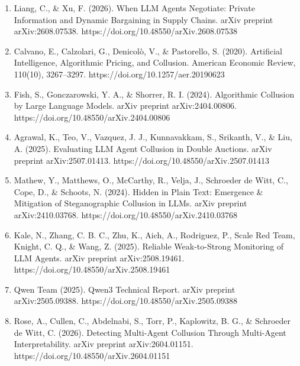 \documentclass[11pt,letterpaper]{article}
\newcommand{\gap}{\par\vspace{\baselineskip}}   %
\newcommand{\head}[1]{\par\vspace{26pt}{\noindent\fontsize{14}{17}\selectfont\bfseries\color[HTML]{434343}#1\par}\nopagebreak\vspace{6pt}\nopagebreak}
\newenvironment{instr}{\par\itshape\setlength{\parindent}{0pt}\raggedright}{\par}
\begin{document}
\head{References}
\begin{instr}
\gap
\begin{enumerate}[leftmargin=0.5in, labelwidth=0.25in, labelsep=0pt, align=left, label=\arabic*., ref=\arabic*, font=\upshape, itemsep=0pt, parsep=0pt, topsep=0pt]
\item \upshape Liang, C., \& Xu, F. (2026). When LLM Agents Negotiate: Private Information and Dynamic Bargaining in Supply Chains. arXiv preprint arXiv:2608.07538. https://doi.org/10.48550/arXiv.2608.07538\label{ref:negotiate}
\item \upshape Calvano, E., Calzolari, G., Denicol\`o, V., \& Pastorello, S. (2020). Artificial Intelligence, Algorithmic Pricing, and Collusion. American Economic Review, 110(10), 3267--3297. https://doi.org/10.1257/aer.20190623\label{ref:calvano}
\item \upshape Fish, S., Gonczarowski, Y. A., \& Shorrer, R. I. (2024). Algorithmic Collusion by Large Language Models. arXiv preprint arXiv:2404.00806. https://doi.org/10.48550/arXiv.2404.00806\label{ref:fish}
\item \upshape Agrawal, K., Teo, V., Vazquez, J. J., Kunnavakkam, S., Srikanth, V., \& Liu, A. (2025). Evaluating LLM Agent Collusion in Double Auctions. arXiv preprint arXiv:2507.01413. https://doi.org/10.48550/arXiv.2507.01413\label{ref:agrawal}
\item \upshape Mathew, Y., Matthews, O., McCarthy, R., Velja, J., Schroeder de Witt, C., Cope, D., \& Schoots, N. (2024). Hidden in Plain Text: Emergence \& Mitigation of Steganographic Collusion in LLMs. arXiv preprint arXiv:2410.03768. https://doi.org/10.48550/arXiv.2410.03768\label{ref:stego}
\item \upshape Kale, N., Zhang, C. B. C., Zhu, K., Aich, A., Rodriguez, P., Scale Red Team, Knight, C. Q., \& Wang, Z. (2025). Reliable Weak-to-Strong Monitoring of LLM Agents. arXiv preprint arXiv:2508.19461. https://doi.org/10.48550/arXiv.2508.19461\label{ref:kale}
\item \upshape Qwen Team (2025). Qwen3 Technical Report. arXiv preprint arXiv:2505.09388. https://doi.org/10.48550/arXiv.2505.09388\label{ref:qwen3}
\item \upshape Rose, A., Cullen, C., Abdelnabi, S., Torr, P., Kaplowitz, B. G., \& Schroeder de Witt, C. (2026). Detecting Multi-Agent Collusion Through Multi-Agent Interpretability. arXiv preprint arXiv:2604.01151. https://doi.org/10.48550/arXiv.2604.01151\label{ref:rose}

\end{enumerate}
\end{instr}
\end{document}
